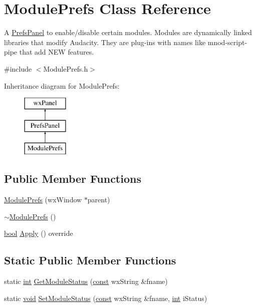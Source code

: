 \hypertarget{class_module_prefs}{}\section{Module\+Prefs Class Reference}
\label{class_module_prefs}


A \hyperlink{class_prefs_panel}{Prefs\+Panel} to enable/disable certain modules. \textquotesingle{}Modules\textquotesingle{} are dynamically linked libraries that modify Audacity. They are plug-\/ins with names like mnod-\/script-\/pipe that add N\+EW features.  




{\ttfamily \#include $<$Module\+Prefs.\+h$>$}

Inheritance diagram for Module\+Prefs\+:\begin{figure}[H]
\begin{center}
\leavevmode
\includegraphics[height=3.000000cm]{class_module_prefs}
\end{center}
\end{figure}
\subsection*{Public Member Functions}
\begin{DoxyCompactItemize}
\item 
\hyperlink{class_module_prefs_a919403bf9af046d4c30e7d17662e29b8}{Module\+Prefs} (wx\+Window $\ast$parent)
\item 
\hyperlink{class_module_prefs_a6566091d0bf71f4bdadedd2e2b54ec44}{$\sim$\+Module\+Prefs} ()
\item 
\hyperlink{mac_2config_2i386_2lib-src_2libsoxr_2soxr-config_8h_abb452686968e48b67397da5f97445f5b}{bool} \hyperlink{class_module_prefs_a63ef4772de3eb2a06b46ebabf2eaea2c}{Apply} () override
\end{DoxyCompactItemize}
\subsection*{Static Public Member Functions}
\begin{DoxyCompactItemize}
\item 
static \hyperlink{xmltok_8h_a5a0d4a5641ce434f1d23533f2b2e6653}{int} \hyperlink{class_module_prefs_a1edb6a0f9d8f50689acbbebab4ac51ab}{Get\+Module\+Status} (\hyperlink{getopt1_8c_a2c212835823e3c54a8ab6d95c652660e}{const} wx\+String \&fname)
\item 
static \hyperlink{sound_8c_ae35f5844602719cf66324f4de2a658b3}{void} \hyperlink{class_module_prefs_ab359f853c3fa54486457a610252cc6a9}{Set\+Module\+Status} (\hyperlink{getopt1_8c_a2c212835823e3c54a8ab6d95c652660e}{const} wx\+String \&fname, \hyperlink{xmltok_8h_a5a0d4a5641ce434f1d23533f2b2e6653}{int} i\+Status)
\end{DoxyCompactItemize}


